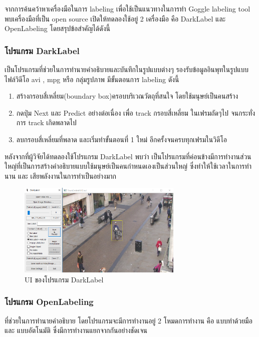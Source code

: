 	จากการค้นคว้าหาเครื่องมือในการ labeling เพื่อใช้เป็นแนวทางในการทำ Goggle labeling tool พบเครื่องมือที่เป็น open source เปิดให้ทดลองใช้อยู่ 2 เครื่องมือ คือ DarkLabel และ OpenLabeling โดยสรุปข้อสำคัญได้ดังนี้ 

\subsubsection*{โปรแกรม DarkLabel}
เป็นโปรแกรมที่ช่วยในการทำนายคำอธิบายและบันทึกในรูปแบบต่างๆ รองรับข้อมูลอินพุทในรูปแบบไฟล์วิดีโอ avi , mpg หรือ กลุ่มรูปภาพ มีขั้นตอนการ labeling ดังนี้ 
\begin{enumerate}
	\setlength\itemsep{-0.25em}
	\item สร้างกรอบสี่เหลี่ยม(boundary box)ครอบบริเวณวัตถุที่สนใจ โดยใช้มนุษย์เป็นคนสร้าง
	\item กดปุ่ม Next และ Predict อย่างต่อเนื่อง เพื่อ track กรอบสี่เหลี่ยม ในเฟรมถัดๆไป จนกระทั่งการ track เกิดพลาดไป
	\item ลบกรอบสี่เหลี่ยมที่พลาด และเริ่มทำขั้นตอนที่ 1 ใหม่ อีกครั้งจนครบทุกเฟรมในวิดีโอ
\end{enumerate}
หลังจากที่ผู้วิจัยได้ทดลองใช้โปรแกรม DarkLabel พบว่า เป็นโปรแกรมที่ค่อนข้างมีการทำงานส่วนใหญ่ที่เป็นการสร้างคำอธิบายแบบใช้มนุษย์เป็นคนกำหนดเองเป็นส่วนใหญ่ ซึ่งทำให้ใช้เวลาในการทำนาน และ เสียพลังงานในการทำเป็นอย่างมาก 


\begin{figure}[!ht]
	\centering
	\includegraphics[width=0.7\textwidth]{chapter2/images/darklabel.png}
		\caption{UI ของโปรแกรม DarkLabel}
    	\label{fig:darklabel}
\end{figure}


\clearpage
\subsubsection*{โปรแกรม OpenLabeling}
ที่ช่วยในการทำนายคำอธิบาย โดยโปรแกรมจะมีการทำงานอยู่ 2 โหมดการทำงาน คือ แบบทำด้วยมือ และ แบบอัตโนมัติ ซึ่งมีการทำงานแยกจากกันอย่างชัดเจน 

